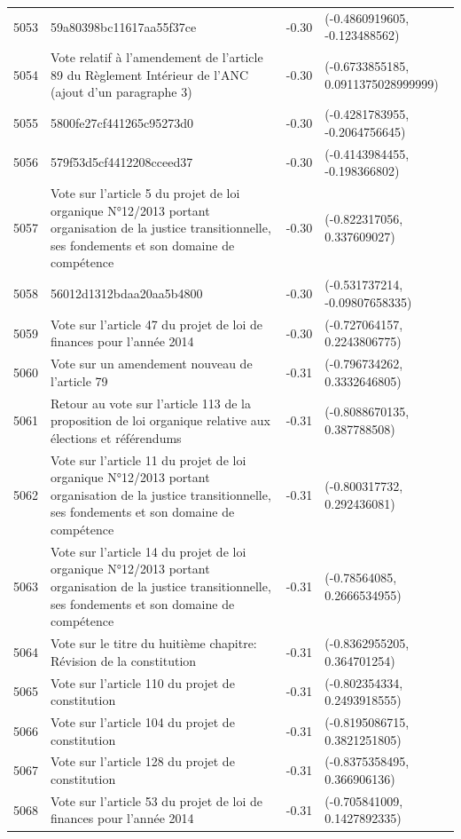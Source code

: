 \begin{table}[ht]
\begin{tabular}{rlrl}
  5053 & 59a80398bc11617aa55f37ce & -0.30 & (-0.4860919605, -0.123488562) \\ 
  5054 & Vote relatif à l'amendement de l'article 89 du Règlement Intérieur de l'ANC (ajout d'un paragraphe 3) & -0.30 & (-0.6733855185, 0.0911375028999999) \\ 
  5055 & 5800fe27cf441265c95273d0 & -0.30 & (-0.4281783955, -0.2064756645) \\ 
  5056 & 579f53d5cf4412208cceed37 & -0.30 & (-0.4143984455, -0.198366802) \\ 
  5057 & Vote sur l'article 5 du projet de loi organique N°12/2013 portant organisation de la justice transitionnelle, ses fondements et son domaine de compétence & -0.30 & (-0.822317056, 0.337609027) \\ 
  5058 & 56012d1312bdaa20aa5b4800 & -0.30 & (-0.531737214, -0.09807658335) \\ 
  5059 & Vote sur l'article 47 du projet de loi de finances pour l'année 2014 & -0.30 & (-0.727064157, 0.2243806775) \\ 
  5060 & Vote sur un amendement nouveau de l'article 79 & -0.31 & (-0.796734262, 0.3332646805) \\ 
  5061 & Retour au vote sur l'article 113 de la proposition de loi organique relative aux élections et référendums & -0.31 & (-0.8088670135, 0.387788508) \\ 
  5062 & Vote sur l'article 11 du projet de loi organique N°12/2013 portant organisation de la justice transitionnelle, ses fondements et son domaine de compétence & -0.31 & (-0.800317732, 0.292436081) \\ 
  5063 & Vote sur l'article 14 du projet de loi organique N°12/2013 portant organisation de la justice transitionnelle, ses fondements et son domaine de compétence & -0.31 & (-0.78564085, 0.2666534955) \\ 
  5064 & Vote sur le titre du huitième chapitre: Révision de la constitution & -0.31 & (-0.8362955205, 0.364701254) \\ 
  5065 & Vote sur l'article 110 du projet de constitution & -0.31 & (-0.802354334, 0.2493918555) \\ 
  5066 & Vote sur l'article 104 du projet de constitution & -0.31 & (-0.8195086715, 0.3821251805) \\ 
  5067 & Vote sur l'article 128 du projet de constitution & -0.31 & (-0.8375358495, 0.366906136) \\ 
  5068 & Vote sur l'article 53 du projet de loi de finances pour l'année 2014 & -0.31 & (-0.705841009, 0.1427892335) \\ 

\end{tabular}
\end{table}

